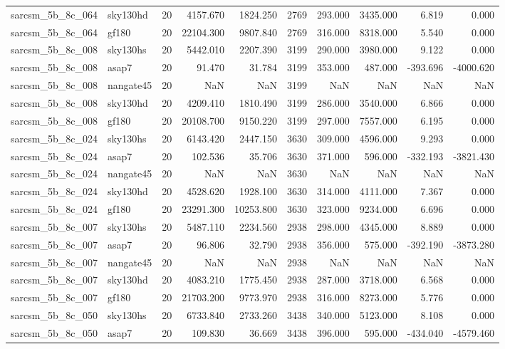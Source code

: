 \documentclass{article}
\begin{document}
\begin{longtable}{llrrrrrrrr}
sarcsm\_5b\_8c\_064 & sky130hd & 20 & 4157.670 & 1824.250 & 2769 & 293.000 & 3435.000 & 6.819 & 0.000 \\
sarcsm\_5b\_8c\_064 & gf180 & 20 & 22104.300 & 9807.840 & 2769 & 316.000 & 8318.000 & 5.540 & 0.000 \\
sarcsm\_5b\_8c\_008 & sky130hs & 20 & 5442.010 & 2207.390 & 3199 & 290.000 & 3980.000 & 9.122 & 0.000 \\
sarcsm\_5b\_8c\_008 & asap7 & 20 & 91.470 & 31.784 & 3199 & 353.000 & 487.000 & -393.696 & -4000.620 \\
sarcsm\_5b\_8c\_008 & nangate45 & 20 & NaN & NaN & 3199 & NaN & NaN & NaN & NaN \\
sarcsm\_5b\_8c\_008 & sky130hd & 20 & 4209.410 & 1810.490 & 3199 & 286.000 & 3540.000 & 6.866 & 0.000 \\
sarcsm\_5b\_8c\_008 & gf180 & 20 & 20108.700 & 9150.220 & 3199 & 297.000 & 7557.000 & 6.195 & 0.000 \\
sarcsm\_5b\_8c\_024 & sky130hs & 20 & 6143.420 & 2447.150 & 3630 & 309.000 & 4596.000 & 9.293 & 0.000 \\
sarcsm\_5b\_8c\_024 & asap7 & 20 & 102.536 & 35.706 & 3630 & 371.000 & 596.000 & -332.193 & -3821.430 \\
sarcsm\_5b\_8c\_024 & nangate45 & 20 & NaN & NaN & 3630 & NaN & NaN & NaN & NaN \\
sarcsm\_5b\_8c\_024 & sky130hd & 20 & 4528.620 & 1928.100 & 3630 & 314.000 & 4111.000 & 7.367 & 0.000 \\
sarcsm\_5b\_8c\_024 & gf180 & 20 & 23291.300 & 10253.800 & 3630 & 323.000 & 9234.000 & 6.696 & 0.000 \\
sarcsm\_5b\_8c\_007 & sky130hs & 20 & 5487.110 & 2234.560 & 2938 & 298.000 & 4345.000 & 8.889 & 0.000 \\
sarcsm\_5b\_8c\_007 & asap7 & 20 & 96.806 & 32.790 & 2938 & 356.000 & 575.000 & -392.190 & -3873.280 \\
sarcsm\_5b\_8c\_007 & nangate45 & 20 & NaN & NaN & 2938 & NaN & NaN & NaN & NaN \\
sarcsm\_5b\_8c\_007 & sky130hd & 20 & 4083.210 & 1775.450 & 2938 & 287.000 & 3718.000 & 6.568 & 0.000 \\
sarcsm\_5b\_8c\_007 & gf180 & 20 & 21703.200 & 9773.970 & 2938 & 316.000 & 8273.000 & 5.776 & 0.000 \\
sarcsm\_5b\_8c\_050 & sky130hs & 20 & 6733.840 & 2733.260 & 3438 & 340.000 & 5123.000 & 8.108 & 0.000 \\
sarcsm\_5b\_8c\_050 & asap7 & 20 & 109.830 & 36.669 & 3438 & 396.000 & 595.000 & -434.040 & -4579.460 \\

\end{longtable}
\end{document}

